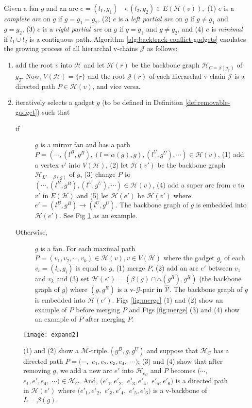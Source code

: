 \documentclass[11pt]{article}
\newcommand{\HH}{\mathcal{H}}
\newcommand{\MM}{\mathcal{M}}
\newcommand{\GG}{\mathcal{G}}
\newcommand{\VV}{\mathcal{V}}
\newcommand{\JJ}{\mathcal{J}}
\begin{document}
Given a fan $g$ and an arc $e=(l_1, g_1)\rightarrow (l_2, g_2)\in E(\HH(v)),$
(1) $e$ is a \emph{complete arc} on $g$ if
$g=g_1=g_2$,
(2) $e$ is a \emph{left partial arc} on $g$ if
$g\neq g_1$ and $g=g_2$,
(3) $e$ is a \emph{right partial arc} on $g$ if
$g=g_1$ and $g\neq g_2$, and
(4) $e$ is \emph{minimal} if
$l_1\cup l_2$ is a contiguous path.
Algorithm \ref{alg:backtrack-conflict-gadgets}
emulates the growing process of all hierarchal v-chains $\JJ$ as follows:
\begin{enumerate}
\item add the root $v$ into $\HH$ and
let $\HH(r)$ be the backbone graph $\HH_{C=\beta(g_T)}$
of $g_T$.
Now, $V(\HH)=\{r\}$ and
the root $\JJ(r)$ of each hierarchal v-chain $\JJ$ is a directed path $P\in \HH(v)$,
and vice versa.

\item iteratively selects a gadget $g$
(to be defined in Definition \ref{def:removable-gadget})
such that
\begin{description}
\item [if] $g$ is a mirror fan and has a path
$P=(\cdots, (l^B, g^B), (l=\alpha(g), g), (l^U, g^U), \cdots) \in \HH(v)$,
(1) add a vertex $v'$ into $V(\HH)$,
(2) let $\HH(v')$ be the backbone graph $\HH_{L'=\beta(g)}$ of $g$,
(3) change $P$ to $(\cdots, (l^B, g^B), (l^U, g^U), \cdots) \in \HH(v)$,
(4) add a super arc from $v$ to $v'$ in $E(\HH)$ and
(5) let $\HH(e')$ be $\HH(v')$ where $e'=(l^B, g^B) \rightarrow (l^U, g^U)$.
The backbone graph of $g$ is embedded into $\HH(e')$.
See Fig \ref{fig:expand} as an example.



\item [Otherwise,] $g$ is a fan.
For each maximal path $P=(v_1, v_2, \cdots, v_k)\in \HH(v), v\in V(\HH)$
where the gadget $g_i$ of each $v_i=(l_i, g_i)$ is equal to $g$,
(1) merge $P$,
(2) add an arc $e'$ between $v_1$ and $v_k$
and (3) set $\HH(e')=(\beta(g)\cap \alpha(g^R), g^R)$
(the backbone graph of $g$)
where $(g, g^R)$ is a v-$\GG$-pair in $\hat{\VV}$.
The backbone graph of $g$ is embedded into $\HH(e')$.
Figs \ref{fig:merge} (1) and (2) show an example of $P$
before merging $P$ and
Figs \ref{fig:merge} (3) and (4) show an example of $P$
after merging $P$.
\end{description}
\end{enumerate}

\begin{figure}[t]
\centering
\texttt{[image: expand2]}
\caption{(1) and (2) show a $\MM$-triple $(g^B, g, g^U)$ and
suppose that $\HH_C$ has a directed path $P=(\cdots,$ $e_1, e_2, e_3, e_4,$ $\cdots)$;
(3) and (4) show that after removing $g$, we add a new arc $e'$ into
$\HH_{e_C}$ and
$P$ becomes $(\cdots,$ $e_1, e', e_4,$ $\cdots)\in \HH_C$. And,
$(e'_1, e'_2,$ $e'_3, e'_4,$ $e'_5, e'_6)$ is a directed path in $\HH(e')$
where $(e'_1, e'_2,$ $e'_3, e'_4,$ $e'_5, e'_6)$
is a v-backbone of $L=\beta(g)$.
}
\label{fig:expand}
\end{figure}
\end{document}
